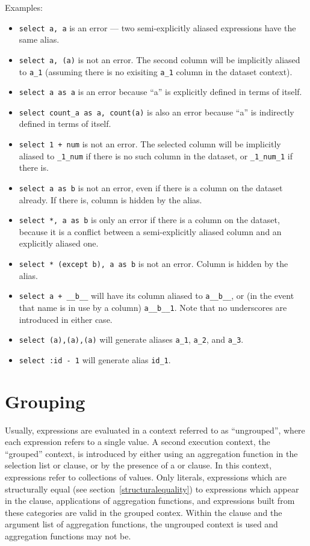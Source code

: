 \documentclass{article}
\begin{document}
Examples:
\begin{itemize}
\item \lstinline|select a, a| is an error --- two semi-explicitly
  aliased expressions have the same alias.
\item \lstinline|select a, (a)| is not an error.  The second column
  will be implicitly aliased to \lstinline|a_1| (assuming there is no
  exisiting \lstinline|a_1| column in the dataset context).
\item \lstinline|select a as a| is an error because ``a'' is
  explicitly defined in terms of itself.
\item \lstinline|select count_a as a, count(a)| is also an error
  because ``a'' is indirectly defined in terms of itself.
\item \lstinline|select 1 + num| is not an error.  The selected
  column will be implicitly aliased to \lstinline|_1_num| if there
  is no such column in the dataset, or \lstinline|_1_num_1| if there is.
\item \lstinline|select a as b| is not an error, even if there is a
  column  on the dataset already.  If there is, column
   is hidden by the alias.
\item \lstinline|select *, a as b| is only an error if there is a
   column on the dataset, because it is a conflict between a
  semi-explicitly aliased column and an explicitly aliased one.
\item \lstinline|select * (except b), a as b| is not an error.  Column
   is hidden by the alias.
\item \lstinline|select a + __b__| will have its column aliased to
  \lstinline|a__b__|, or (in the event that name is in use by a
  column) \lstinline|a__b__1|.  Note that no underscores are
  introduced in either case.
\item \lstinline|select (a),(a),(a)| will generate aliases
  \lstinline|a_1|, \lstinline|a_2|, and \lstinline|a_3|.
\item \lstinline|select :id - 1| will generate alias \lstinline|id_1|.
\end{itemize}

\section{Grouping}

Usually, expressions are evaluated in a context referred to as
``ungrouped'', where each expression refers to a single value.  A
second execution context, the ``grouped'' context, is introduced by
either using an aggregation function in the selection list or
 clause, or by the presence of a  or
 clause.  In this context, expressions refer to
collections of values.  Only literals, expressions which are
structurally equal (see section~\vref{structuralequality}) to
expressions which appear in the  clause, applications
of aggregation functions, and expressions built from these categories
are valid in the grouped contex.  Within the  clause and
the argument list of aggregation functions, the ungrouped context is
used and aggregation functions may not be.
\end{document}
